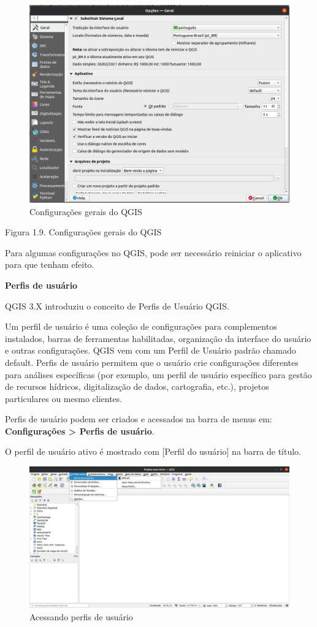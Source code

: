 \documentclass[
]{krantz}
\begin{document}
\begin{figure}
\centering
\includegraphics{media/modulo1/change-theme.png}
\caption{Configurações gerais do QGIS}
\end{figure}

Figura 1.9. Configurações gerais do QGIS

Para algumas configurações no QGIS, pode ser necessário reiniciar o aplicativo para que tenham efeito.

\textbf{Perfis de usuário}

QGIS 3.X introduziu o conceito de Perfis de Usuário QGIS.

Um perfil de usuário é uma coleção de configurações para complementos instalados, barras de ferramentas habilitadas, organização da interface do usuário e outras configurações. QGIS vem com um Perfil de Usuário padrão chamado default. Perfis de usuário permitem que o usuário crie configurações diferentes para análises específicas (por exemplo, um perfil de usuário específico para gestão de recursos hídricos, digitalização de dados, cartografia, etc.), projetos particulares ou mesmo clientes.

Perfis de usuário podem ser criados e acessados na barra de menus em: \textbf{Configurações \textgreater{} Perfis de usuário}.

O perfil de usuário ativo é mostrado com {[}Perfil do usuário{]} na barra de título.

\begin{figure}
\centering
\includegraphics{media/modulo1/user-profiles-1.png}
\caption{Acessando perfis de usuário}
\end{figure}
\end{document}
